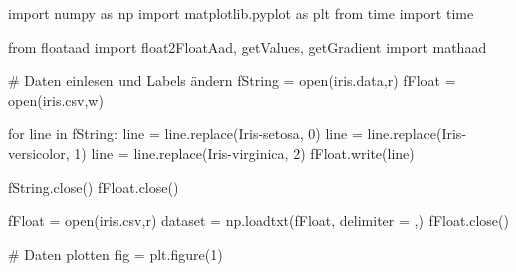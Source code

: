 \documentclass[
  a4paper,
  DIV=11]{scrreprt}
\newenvironment{Shaded}{\begin{snugshade}}{\end{snugshade}}
\newcommand{\BuiltInTok}[1]{\textcolor[rgb]{0.00,0.23,0.31}{#1}}
\newcommand{\CommentTok}[1]{\textcolor[rgb]{0.37,0.37,0.37}{#1}}
\newcommand{\ControlFlowTok}[1]{\textcolor[rgb]{0.00,0.23,0.31}{#1}}
\newcommand{\DecValTok}[1]{\textcolor[rgb]{0.68,0.00,0.00}{#1}}
\newcommand{\ImportTok}[1]{\textcolor[rgb]{0.00,0.46,0.62}{#1}}
\newcommand{\KeywordTok}[1]{\textcolor[rgb]{0.00,0.23,0.31}{#1}}
\newcommand{\NormalTok}[1]{\textcolor[rgb]{0.00,0.23,0.31}{#1}}
\newcommand{\OperatorTok}[1]{\textcolor[rgb]{0.37,0.37,0.37}{#1}}
\newcommand{\StringTok}[1]{\textcolor[rgb]{0.13,0.47,0.30}{#1}}
\theoremstyle{definition}
\theoremstyle{definition}
\theoremstyle{remark}
\begin{document}
\begin{Shaded}
\begin{Highlighting}[]
\ImportTok{import}\NormalTok{ numpy }\ImportTok{as}\NormalTok{ np}
\ImportTok{import}\NormalTok{ matplotlib.pyplot }\ImportTok{as}\NormalTok{ plt}
\ImportTok{from}\NormalTok{ time }\ImportTok{import}\NormalTok{ time}

\ImportTok{from}\NormalTok{ floataad }\ImportTok{import}\NormalTok{ float2FloatAad, getValues, getGradient}
\ImportTok{import}\NormalTok{ mathaad}

\CommentTok{\# Daten einlesen und Labels ändern}
\NormalTok{fString }\OperatorTok{=} \BuiltInTok{open}\NormalTok{(}\StringTok{\textquotesingle{}iris.data\textquotesingle{}}\NormalTok{,}\StringTok{\textquotesingle{}r\textquotesingle{}}\NormalTok{)}
\NormalTok{fFloat  }\OperatorTok{=} \BuiltInTok{open}\NormalTok{(}\StringTok{\textquotesingle{}iris.csv\textquotesingle{}}\NormalTok{,}\StringTok{\textquotesingle{}w\textquotesingle{}}\NormalTok{)}

\ControlFlowTok{for}\NormalTok{ line }\KeywordTok{in}\NormalTok{ fString:}
\NormalTok{    line }\OperatorTok{=}\NormalTok{ line.replace(}\StringTok{\textquotesingle{}Iris{-}setosa\textquotesingle{}}\NormalTok{, }\StringTok{\textquotesingle{}0\textquotesingle{}}\NormalTok{)}
\NormalTok{    line }\OperatorTok{=}\NormalTok{ line.replace(}\StringTok{\textquotesingle{}Iris{-}versicolor\textquotesingle{}}\NormalTok{, }\StringTok{\textquotesingle{}1\textquotesingle{}}\NormalTok{)}
\NormalTok{    line }\OperatorTok{=}\NormalTok{ line.replace(}\StringTok{\textquotesingle{}Iris{-}virginica\textquotesingle{}}\NormalTok{, }\StringTok{\textquotesingle{}2\textquotesingle{}}\NormalTok{)}
\NormalTok{    fFloat.write(line)}

\NormalTok{fString.close()}
\NormalTok{fFloat.close()}

\NormalTok{fFloat }\OperatorTok{=} \BuiltInTok{open}\NormalTok{(}\StringTok{\textquotesingle{}iris.csv\textquotesingle{}}\NormalTok{,}\StringTok{\textquotesingle{}r\textquotesingle{}}\NormalTok{)}
\NormalTok{dataset }\OperatorTok{=}\NormalTok{ np.loadtxt(fFloat, delimiter }\OperatorTok{=} \StringTok{\textquotesingle{},\textquotesingle{}}\NormalTok{)}
\NormalTok{fFloat.close()}

\CommentTok{\# Daten plotten}
\NormalTok{fig }\OperatorTok{=}\NormalTok{ plt.figure(}\DecValTok{1}\NormalTok{)}


\end{Highlighting}
\end{Shaded}
\end{document}
